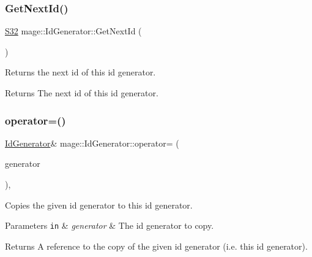 \subsubsection{\texorpdfstring{Get\+Next\+Id()}{GetNextId()}}
{\footnotesize\ttfamily \hyperlink{namespacemage_a642e05c5c83642b6946703615cdbf2da}{S32} mage\+::\+Id\+Generator\+::\+Get\+Next\+Id (\begin{DoxyParamCaption}{ }\end{DoxyParamCaption})\hspace{0.3cm}{\ttfamily [noexcept]}}

Returns the next id of this id generator.

\begin{DoxyReturn}{Returns}
The next id of this id generator. 
\end{DoxyReturn}
\hypertarget{classmage_1_1_id_generator_ac731a36eb2824cb8f6633d0df543847c}{}\label{classmage_1_1_id_generator_ac731a36eb2824cb8f6633d0df543847c} 
\subsubsection{\texorpdfstring{operator=()}{operator=()}\hspace{0.1cm}{\footnotesize\ttfamily [1/2]}}
{\footnotesize\ttfamily \hyperlink{classmage_1_1_id_generator}{Id\+Generator}\& mage\+::\+Id\+Generator\+::operator= (\begin{DoxyParamCaption}\item[{const \hyperlink{classmage_1_1_id_generator}{Id\+Generator} \&}]{generator }\end{DoxyParamCaption})\hspace{0.3cm}{\ttfamily [default]}, {\ttfamily [noexcept]}}

Copies the given id generator to this id generator.


\begin{DoxyParams}[1]{Parameters}
\mbox{\tt in}  & {\em generator} & The id generator to copy. \\
\hline
\end{DoxyParams}
\begin{DoxyReturn}{Returns}
A reference to the copy of the given id generator (i.\+e. this id generator). 
\end{DoxyReturn}
\hypertarget{classmage_1_1_id_generator_abf29fa46e1bb19dd878462fc2610e3a8}{}\label{classmage_1_1_id_generator_abf29fa46e1bb19dd878462fc2610e3a8} 
